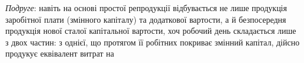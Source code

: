 \emph{Подруге}: навіть на основі простої репродукції відбувається не лише
продукція заробітної плати (змінного капіталу) та додаткової вартости,
а й безпосередня продукція нової сталої капітальної вартости, хоч робочий
день складається лише з двох частин: з однієї, що протягом її
робітних покриває змінний капітал, дійсно продукує еквівалент витрат на
\parbreak{}  %

